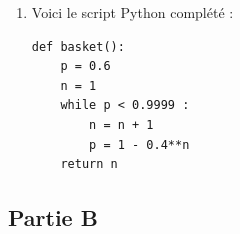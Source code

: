 \documentclass[10pt]{article}
\providecommand{\np}[2][]{{#2~#1}}
\begin{document}
\begin{enumerate}
\begin{enumerate}
			Or \quad $\dfrac{\ln \left( \np{0,0001} \right)}{\ln\left( \np{0,4} \right)} \approx \np{10,052}$.

			À partir de 11 lancers, la probabilité d'en réussir au moins un est supérieure à \np{0,9999}.

			\item Voici le script Python complété :
\begin{lstlisting}[style=python,xleftmargin=0.3\linewidth,xrightmargin=0.3\linewidth,numbers=none]
def basket():
	p = 0.6
	n = 1
	while p < 0.9999 :
		n = n + 1
		p = 1 - 0.4**n
	return n
\end{lstlisting}
		\end{enumerate}
	\end{enumerate}

	\subsection*{Partie B}
\end{document}
